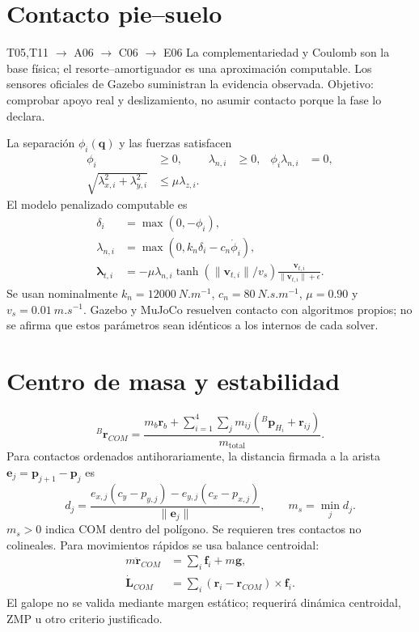 \documentclass[11pt,letterpaper]{article}
\newcommand{\vect}[1]{\bm{#1}}
\begin{document}
\section{Contacto pie--suelo}
\begin{tracebox}{T05,T11 $\rightarrow$ A06 $\rightarrow$ C06 $\rightarrow$ E06}
La complementariedad y Coulomb son la base física; el resorte--amortiguador es
una aproximación computable. Los sensores oficiales de Gazebo suministran la
evidencia observada. Objetivo: comprobar apoyo real y deslizamiento, no asumir
contacto porque la fase lo declara.
\end{tracebox}
La separación $\phi_i(\vect q)$ y las fuerzas satisfacen
\begin{align}
 \phi_i&\ge0,&\lambda_{n,i}&\ge0,&\phi_i\lambda_{n,i}&=0,\label{eq:complementarity}\\
 \sqrt{\lambda_{x,i}^2+\lambda_{y,i}^2}&\le\mu\lambda_{z,i}.\label{eq:frictioncone}
\end{align}
El modelo penalizado computable es
\begin{align}
 \delta_i&=\max(0,-\phi_i),\\
 \lambda_{n,i}&=\max(0,k_n\delta_i-c_n\dot\phi_i),\\
 \vect\lambda_{t,i}&=-\mu\lambda_{n,i}
 \tanh(\|\vect v_{t,i}\|/v_s)\frac{\vect v_{t,i}}
 {\|\vect v_{t,i}\|+\epsilon}.
\end{align}
Se usan nominalmente $k_n=\SI{12000}{N.m^{-1}}$,
$c_n=\SI{80}{N.s.m^{-1}}$, $\mu=0.90$ y $v_s=\SI{0.01}{m.s^{-1}}$.
Gazebo y MuJoCo resuelven contacto con algoritmos propios; no se afirma que
estos parámetros sean idénticos a los internos de cada solver.

\section{Centro de masa y estabilidad}
\begin{equation}
 {}^B\vect r_{COM}=\frac{m_b\vect r_b+
 \sum_{i=1}^4\sum_jm_{ij}({}^B\vect p_{H_i}+\vect r_{ij})}{m_{\mathrm{total}}}.
\end{equation}
Para contactos ordenados antihorariamente, la distancia firmada a la arista
$\vect e_j=\vect p_{j+1}-\vect p_j$ es
\begin{equation}
 d_j=\frac{e_{x,j}(c_y-p_{y,j})-e_{y,j}(c_x-p_{x,j})}{\|\vect e_j\|},
 \qquad m_s=\min_jd_j.\label{eq:staticmargin}
\end{equation}
$m_s>0$ indica COM dentro del polígono. Se requieren tres contactos no
colineales. Para movimientos rápidos se usa balance centroidal:
\begin{align}
 m\ddot{\vect r}_{COM}&=\sum_i\vect f_i+m\vect g,\\
 \dot{\vect L}_{COM}&=\sum_i(\vect r_i-\vect r_{COM})\times\vect f_i.
\end{align}
El galope no se valida mediante margen estático; requerirá dinámica centroidal,
ZMP u otro criterio justificado.
\end{document}
